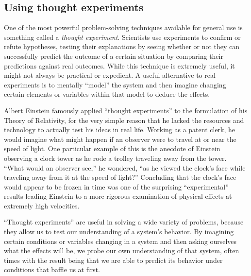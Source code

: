 \filbreak
\subsection{Using thought experiments}

\label{using_thought_experiments}

One of the most powerful problem-solving techniques available for general use is something called a \textit{thought experiment}.  Scientists use experiments to confirm or refute hypotheses, testing their explanations by seeing whether or not they can successfully predict the outcome of a certain situation by comparing their predictions against real outcomes.  While this technique is extremely useful, it might not always be practical or expedient.  A useful alternative to real experiments is to mentally ``model'' the system and then imagine changing certain elements or variables within that model to deduce the effects.    

Albert Einstein famously applied ``thought experiments'' to the formulation of his Theory of Relativity, for the very simple reason that he lacked the resources and technology to actually test his ideas in real life.  Working as a patent clerk, he would imagine what might happen if an observer were to travel at or near the speed of light.  One particular example of this is the anecdote of Einstein observing a clock tower as he rode a trolley traveling away from the tower.  ``What would an observer see,'' he wondered, ``as he viewed the clock's face while traveling away from it at the speed of light?''  Concluding that the clock's face would appear to be frozen in time was one of the surprising ``experimental'' results leading Einstein to a more rigorous examination of physical effects at extremely high velocities.

\vskip 10pt

``Thought experiments'' are useful in solving a wide variety of problems, because they allow us to test our understanding of a system's behavior.  By imagining certain conditions or variables changing in a system and then asking ourselves what the effects will be, we probe our own understanding of that system, often times with the result being that we are able to predict its behavior under conditions that baffle us at first.

